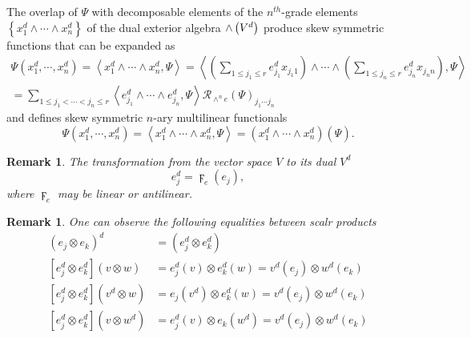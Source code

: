 \documentclass[aps,preprint]{revtex4}%
\newtheorem{remark}[theorem]{Remark}
\begin{document}
The overlap of $\Psi$ with decomposable elements of the $n^{th}$-grade
elements $\left\{  x_{1}^{d}\wedge\cdots\wedge x_{n}^{d}\right\}  $ of the
dual exterior algebra ${\LARGE \wedge}\left(  V^{d}\right)  $ produce skew
symmetric functions that can be expanded as
\begin{gather}
\Psi\left(  x_{1}^{d},\cdots,x_{n}^{d}\right)  =\left\langle x_{1}^{d}%
\wedge\cdots\wedge x_{n}^{d},\Psi\right\rangle =\left\langle \left(
\sum_{1\leq j_{1}\leq r}e_{j_{1}}^{d}x_{j_{1}1}\right)  \wedge\cdots
\wedge\left(  \sum_{1\leq j_{n}\leq r}e_{j_{n}}^{d}x_{j_{n}n}\right)
,\Psi\right\rangle \\
=\sum_{1\leq j_{1}<\cdots<j_{n}\leq r}\left\langle e_{j_{1}}^{d}\wedge
\cdots\wedge e_{j_{n}}^{d},\Psi\right\rangle \mathcal{R}_{\wedge^{n}e}\left(
\Psi\right)  _{j_{1}\cdots j_{n}}%
\end{gather}
and defines skew symmetric $n$-ary multilinear functionals
\begin{equation}
\Psi\left(  x_{1}^{d},\cdots,x_{n}^{d}\right)  =\left\langle x_{1}^{d}%
\wedge\cdots\wedge x_{n}^{d},\Psi\right\rangle =\left(  x_{1}^{d}\wedge
\cdots\wedge x_{n}^{d}\right)  \left(  \overset{}{\Psi}\right)  .
\end{equation}


\begin{remark}
The transformation from the vector space $V$ to its dual $V^{d}$
\begin{equation}
e_{j}^{d}=\digamma_{e}\left(  e_{j}\right)  ,
\end{equation}
where $\digamma_{e}$ may be linear or antilinear.
\end{remark}

\begin{remark}
One can observe the following equalities between scalr products
\begin{align}
\left(  e_{j}\otimes e_{k}\right)  ^{d}  &  =\left(  e_{j}^{d}\otimes
e_{k}^{d}\right) \\
\left[  \overset{}{e_{j}^{d}\otimes e_{k}^{d}}\right]  \left(
\overset{}{v\otimes w}\right)   &  =e_{j}^{d}\left(  v\right)  \otimes
e_{k}^{d}\left(  w\right)  =v^{d}\left(  e_{j}\right)  \otimes w^{d}\left(
e_{k}\right) \\
\left[  \overset{}{e_{j}^{d}\otimes e_{k}^{d}}\right]  \left(
\overset{}{v^{d}\otimes w}\right)   &  =e_{j}\left(  v^{d}\right)  \otimes
e_{k}^{d}\left(  w\right)  =v^{d}\left(  e_{j}\right)  \otimes w^{d}\left(
e_{k}\right) \\
\left[  \overset{}{e_{j}^{d}\otimes e_{k}^{d}}\right]  \left(
\overset{}{v\otimes w^{d}}\right)   &  =e_{j}^{d}\left(  v\right)  \otimes
e_{k}\left(  w^{d}\right)  =v^{d}\left(  e_{j}\right)  \otimes w^{d}\left(
e_{k}\right)
\end{align}

\end{remark}
\end{document}
